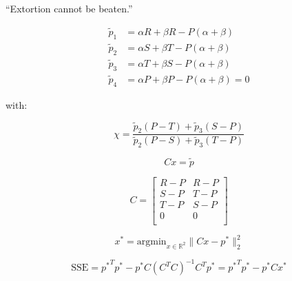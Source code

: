 \documentclass{beamer}
\begin{document}
\begin{frame}
    \begin{center}
        \Huge
        ``Extortion cannot be beaten.''
    \end{center}
\end{frame}

\begin{frame}
    \Large
    \begin{align}
    \tilde p_1 & = \alpha R + \beta R - P (\alpha + \beta)
            \label{eqn:condition_for_tilde_p1}\\
    \tilde p_2 & = \alpha S + \beta T - P (\alpha + \beta)
            \label{eqn:condition_for_tilde_p2}\\
    \tilde p_3 & = \alpha T + \beta S - P (\alpha + \beta)
            \label{eqn:condition_for_tilde_p3}\\
    \tilde p_4 & = \alpha P + \beta P - P (\alpha + \beta) = 0
            \label{eqn:condition_for_tilde_p4}
    \end{align}

    with:

    \begin{equation}\label{eqn:definition_of_chi}
        \chi = \frac{\tilde p_2 (P - T) + \tilde p_3 (S - P)}
                    {\tilde p_2 (P - S) + \tilde p_3 (T - P)}
    \end{equation}
\end{frame}

\begin{frame}
    \Large
    \begin{equation}\label{eqn:linear_algebraic_equation_for_p}
        Cx= \tilde p
    \end{equation}

    \begin{equation}\label{eqn:definition_of_C}
        C =
        \begin{bmatrix}
            R - P & R- P \\
            S - P & T- P \\
            T - P & S- P \\
            0     & 0 \\
        \end{bmatrix}
    \end{equation}
\end{frame}

\begin{frame}
    \Large
    \begin{equation}\label{eqn:x_star}
        x^* = \text{argmin}_{x\in\mathbb{R}^2}\|C x- p^*\|_2^2
    \end{equation}

    \begin{equation}\label{eqn:x_SSError_formula}
        \text{SSE} = {p ^ *} ^ T p ^ * -
               p ^ * C \left(C ^ T C \right) ^ {-1} C ^ T p ^ *
             = {p ^ *} ^ T p ^ * - p ^ * C x ^ *
    \end{equation}

\end{frame}
\end{document}
